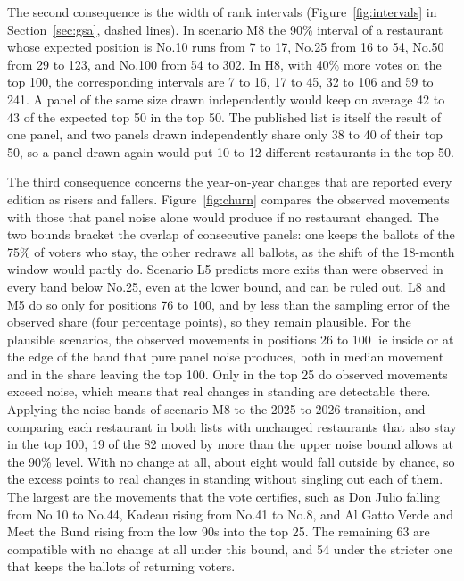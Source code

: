\documentclass[11pt,a4paper]{article}
\begin{document}
The second consequence is the width of rank intervals (Figure~\ref{fig:intervals} in Section~\ref{sec:gsa}, dashed lines). In scenario M8 the 90\% interval of a restaurant whose expected position is No.10 runs from 7 to 17, No.25 from 16 to 54, No.50 from 29 to 123, and No.100 from 54 to 302. In H8, with 40\% more votes on the top 100, the corresponding intervals are 7 to 16, 17 to 45, 32 to 106 and 59 to 241. A panel of the same size drawn independently would keep on average 42 to 43 of the expected top 50 in the top 50. The published list is itself the result of one panel, and two panels drawn independently share only 38 to 40 of their top 50, so a panel drawn again would put 10 to 12 different restaurants in the top 50.

The third consequence concerns the year-on-year changes that are reported every edition as risers and fallers. Figure~\ref{fig:churn} compares the observed movements with those that panel noise alone would produce if no restaurant changed. The two bounds bracket the overlap of consecutive panels: one keeps the ballots of the 75\% of voters who stay, the other redraws all ballots, as the shift of the 18-month window would partly do. Scenario L5 predicts more exits than were observed in every band below No.25, even at the lower bound, and can be ruled out. L8 and M5 do so only for positions 76 to 100, and by less than the sampling error of the observed share (four percentage points), so they remain plausible. For the plausible scenarios, the observed movements in positions 26 to 100 lie inside or at the edge of the band that pure panel noise produces, both in median movement and in the share leaving the top 100. Only in the top 25 do observed movements exceed noise, which means that real changes in standing are detectable there. Applying the noise bands of scenario M8 to the 2025 to 2026 transition, and comparing each restaurant in both lists with unchanged restaurants that also stay in the top 100, 19 of the 82 moved by more than the upper noise bound allows at the 90\% level. With no change at all, about eight would fall outside by chance, so the excess points to real changes in standing without singling out each of them. The largest are the movements that the vote certifies, such as Don Julio falling from No.10 to No.44, Kadeau rising from No.41 to No.8, and Al Gatto Verde and Meet the Bund rising from the low 90s into the top 25. The remaining 63 are compatible with no change at all under this bound, and 54 under the stricter one that keeps the ballots of returning voters.
\end{document}
